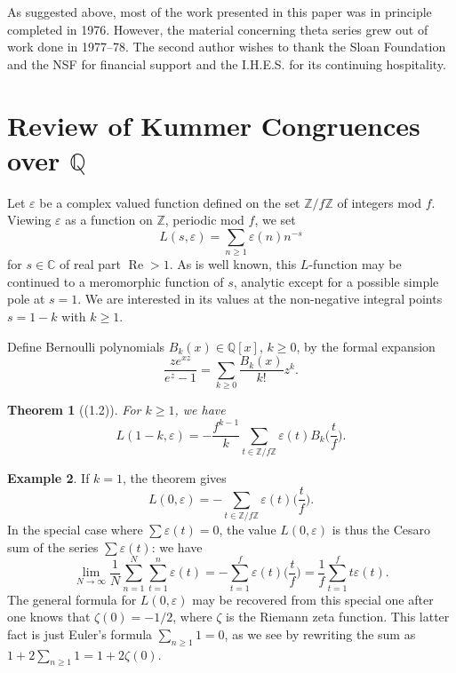 \documentclass[12pt,a4paper]{article}
\theoremstyle{plain}
\newtheorem{theorem}{Theorem}[section]
\theoremstyle{definition}
\newtheorem{example}[theorem]{Example}
\DeclareMathOperator{\Res}{Re}
\newcommand{\Z}{\mathbb{Z}}
\newcommand{\Q}{\mathbb{Q}}
\newcommand{\C}{\mathbb{C}}
\begin{document}
\smallskip
As suggested above, most of the work presented in this paper was in principle completed in 1976. However, the material concerning theta series grew out of work done in 1977--78. The second author wishes to thank the Sloan Foundation and the NSF for financial support and the I.H.E.S. for its continuing hospitality.

\tableofcontents

\newpage
\setcounter{section}{0}

\section{Review of Kummer Congruences over $\Q$}

Let $\varepsilon$ be a complex valued function defined on the set $\Z/f\Z$ of integers mod $f$. Viewing $\varepsilon$ as a function on $\Z$, periodic mod $f$, we set
\begin{equation}\label{eq:L-def}
L(s,\varepsilon)=\sum_{n\ge1}\varepsilon(n)n^{-s}
\end{equation}
for $s\in\C$ of real part $\Res>1$. As is well known, this $L$-function may be continued to a meromorphic function of $s$, analytic except for a possible simple pole at $s=1$. We are interested in its values at the non-negative integral points $s=1-k$ with $k\ge1$.

Define Bernoulli polynomials $B_k(x)\in\Q[x]$, $k\ge0$, by the formal expansion
\[
\frac{ze^{xz}}{e^z-1}=\sum_{k\ge0}\frac{B_k(x)}{k!}z^k.
\]

\begin{theorem}[(1.2)]\label{thm:bernoulli}
For $k\ge1$, we have
\begin{equation}\label{eq:L-bernoulli}
L(1-k,\varepsilon)=-\frac{f^{k-1}}{k}\sum_{t\in\Z/f\Z}\varepsilon(t)B_k\Big(\frac{t}{f}\Big).
\end{equation}
\end{theorem}

\begin{example}
If $k=1$, the theorem gives
\[
L(0,\varepsilon)=-\sum_{t\in\Z/f\Z}\varepsilon(t)\Big(\frac{t}{f}\Big).
\]
In the special case where $\sum\varepsilon(t)=0$, the value $L(0,\varepsilon)$ is thus the Cesaro sum of the series $\sum\varepsilon(t)$: we have
\[
\lim_{N\to\infty}\frac{1}{N}\sum_{n=1}^{N}\sum_{t=1}^{n}\varepsilon(t)=-\sum_{t=1}^{f}\varepsilon(t)\Big(\frac{t}{f}\Big)=\frac{1}{f}\sum_{t=1}^{f}t\varepsilon(t).
\]
The general formula for $L(0,\varepsilon)$ may be recovered from this special one after one knows that $\zeta(0)=-1/2$, where $\zeta$ is the Riemann zeta function. This latter fact is just Euler's formula $\sum_{n\ge1}1=0$, as we see by rewriting the sum as $1+2\sum_{n\ge1}1=1+2\zeta(0)$.
\end{example}
\end{document}
